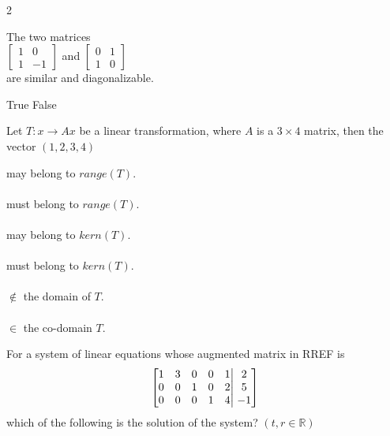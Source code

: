 \documentclass[12pt]{exam}
\newcommand{\ibmatrix}[1]{\begin{bmatrix}#1\end{bmatrix}} %
\newcommand{\separator}{\noindent{\rule[1ex]{0.45\textwidth}{.1pt}}}
\newcommand{\newquestion}[3][x 1 mark(s)]{
    {\fontsize{12}{14}\selectfont
    \uplevel{\separator \\[-2mm] [Qu.]
    \fontsize{14}{16}\selectfont
    \ifthenelse{\equal{#2}{}}{[1 mark(s)]}{[#2 #1]}
    \ifthenelse{\equal{#3}{}}{\ \\[-7mm]}{\\#3\\[-1em]}}
    }}
\newcommand{\nextcol}{\vfill\mbox{}\columnbreak}
\begin{document}
\begin{multicols*}{2}
\begin{questions}
		\newquestion{}{}
		\question[1] The two matrices\\
		$\ibmatrix{1&0\\1&-1}$ and $\ibmatrix{0&1\\1&0}$\\
		are similar and diagonalizable.
	
		\begin{oneparchoices}
			\choice True \quad \choice False
		\end{oneparchoices}

		\nextcol

		\newquestion{}{}
		\question Let $T : x \rightarrow Ax$ be a linear transformation, where $A$ is a $3\times4$ matrix, then the vector $(1,2,3,4)$

		\begin{oneparchoices}
			\choice may belong to $range(T)$.\\\\
			\choice must belong to $range(T)$.\\\\
			\choice may belong to $kern(T)$.\\\\
			\choice must belong to $kern(T)$.\\\\
			\choice $\notin$ the domain of $T$.\\\\
			\choice $\in$ the co-domain $T$.\\
		\end{oneparchoices}

		\newpage
		\newquestion{}{}
		\question[1] For a system of linear equations whose augmented matrix in RREF is\\
		\begin{equation}
			\left \lbrack \begin{matrix}
				1 & 3 & 0 & 0 & 1\\
				0 & 0 & 1 & 0 & 2\\
				0 & 0 & 0 & 1 & 4
			\end{matrix} \right \vert
			\left . \begin{matrix}
				2 \\ 5 \\ -1
			\end{matrix} \right \rbrack \notag
		\end{equation}
		which of the following is the solution of the system? $(t,r \in \mathbb{R})$ \linebreak


\end{questions}
\end{multicols*}
\end{document}
